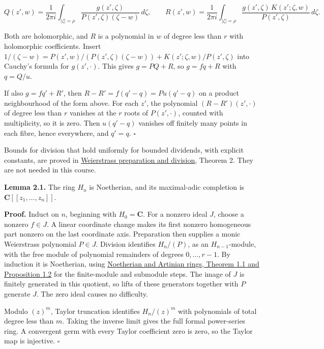 \documentclass[11pt]{article}
\begin{document}
\[
Q(z',w)=\frac1{2\pi i}\int_{|\zeta|=\rho}\frac{g(z',\zeta)}{P(z',\zeta)(\zeta-w)}\,d\zeta,\qquad
R(z',w)=\frac1{2\pi i}\int_{|\zeta|=\rho}\frac{g(z',\zeta)\,K(z';\zeta,w)}{P(z',\zeta)}\,d\zeta .
\]

Both are holomorphic, and \(R\) is a polynomial in \(w\) of degree less
than \(r\) with holomorphic coefficients. Insert
\(1/(\zeta-w)=P(z',w)/(P(z',\zeta)(\zeta-w))+K(z';\zeta,w)/P(z',\zeta)\)
into Cauchy's formula for \(g(z',\cdot)\). This gives \(g=PQ+R\), so
\(g=fq+R\) with \(q=Q/u\).

If also \(g=fq'+R'\), then \(R-R'=f(q'-q)=Pu(q'-q)\) on a product
neighbourhood of the form above. For each \(z'\), the polynomial
\((R-R')(z',\cdot)\) of degree less than \(r\) vanishes at the \(r\)
roots of \(P(z',\cdot)\), counted with multiplicity, so it is zero. Then
\(u(q'-q)\) vanishes off finitely many points in each fibre, hence
everywhere, and \(q'=q\). \(\square\)

Bounds for division that hold uniformly for bounded dividends, with
explicit constants, are proved in
\href{../../analytic-finiteness-and-preparation/weierstrass-preparation-and-division.html\#division-finite-generation-and-elementary-algebra}{Weierstrass
preparation and division}, Theorem 2. They are not needed in this
course.

\textbf{Lemma 2.1.} The ring \(H_n\) is Noetherian, and its maximal-adic
completion is \(\mathbf C[[z_1,\ldots,z_n]]\).

\textbf{Proof.} Induct on \(n\), beginning with \(H_0=\mathbf C\). For a
nonzero ideal \(J\), choose a nonzero \(f\in J\). A linear coordinate
change makes its first nonzero homogeneous part nonzero on the last
coordinate axis. Preparation then supplies a monic Weierstrass
polynomial \(P\in J\). Division identifies \(H_n/(P)\), as an
\(H_{n-1}\)-module, with the free module of polynomial remainders of
degrees \(0,\ldots,r-1\). By induction it is Noetherian, using \href{../../AG-CA/AG-CA-03.html\#1-three-ways-to-recognize-a-noetherian-module}{Noetherian and Artinian rings, Theorem 1.1 and Proposition 1.2} for the finite-module and submodule steps. The image of
\(J\) is finitely generated in this quotient, so lifts of these
generators together with \(P\) generate \(J\). The zero ideal causes no
difficulty.

Modulo \((z)^m\), Taylor truncation identifies \(H_n/(z)^m\) with
polynomials of total degree less than \(m\). Taking the inverse limit
gives the full formal power-series ring. A convergent germ with every
Taylor coefficient zero is zero, so the Taylor map is injective.
\(\square\)
\end{document}
